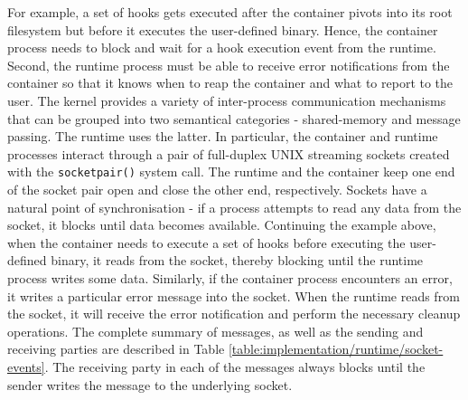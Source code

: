 For example, a set of hooks 
gets executed after the container pivots into its root filesystem but before it executes the user-defined 
binary. 
Hence, the container process needs to block and wait for a hook execution event from the 
runtime. Second, the runtime 
process must be able to receive error notifications from the container so that it knows 
when to reap the container and what to report to the user. The kernel provides a variety of 
inter-process communication mechanisms that can be grouped into two semantical categories - shared-memory 
and message passing. The runtime uses the latter. In particular, the container and runtime processes 
interact through a pair of full-duplex UNIX streaming sockets created with the \verb|socketpair()|
system call. The runtime and the container keep one end of the socket pair open 
and close the other end, respectively. Sockets have a natural point of synchronisation - if a 
process attempts to read any data from the socket, it blocks until data becomes available. Continuing the 
example above, when the container needs to execute a set of hooks before executing the user-defined 
binary, it reads from the socket, thereby blocking until the runtime process writes some data. Similarly, if the 
container process encounters an error, it writes a particular error message into the socket.
When the runtime reads from the socket, it will receive the error notification and perform 
the necessary cleanup operations. The complete summary of messages, as well as the sending and 
receiving parties are described in Table \ref{table:implementation/runtime/socket-events}.
The receiving party in each of the messages always blocks until the sender writes the message
to the underlying socket.

